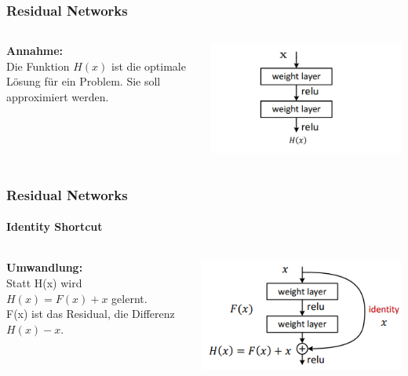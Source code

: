 \documentclass{beamer}
\begin{document}
\begin{frame}
\frametitle{Residual Networks}

\begin{columns}[T]

\begin{column}[T]{5cm}
\textbf{Annahme:}\\
Die Funktion $H(x)$ ist die optimale Lösung für ein Problem. Sie soll approximiert werden.

\end{column}

\begin{column}[T]{7cm}
	\includegraphics[scale=0.5]{figures/block.png}	 
\end{column}

\end{columns}
\end{frame}


\begin{frame}
\frametitle{Residual Networks}
\framesubtitle{Identity Shortcut}

\begin{columns}[T]

\begin{column}[T]{5cm}
\textbf{Umwandlung:}\\
Statt H(x) wird $H(x) = F(x) + x$ gelernt.\\ F(x) ist das Residual, die Differenz $H(x) - x$.


\end{column}

\begin{column}[T]{7cm}
	\includegraphics[scale=0.6]{figures/ResidualBlock.png}	 
\end{column}

\end{columns}
\end{frame}
\end{document}
